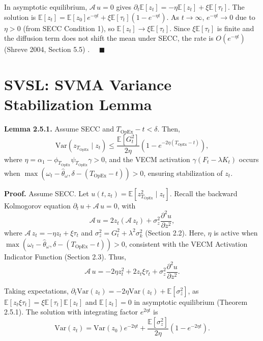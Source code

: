 \documentclass[12pt]{report}
\begin{document}
\vspace{0.2in}

In asymptotic equilibrium, \(\mathcal{A}\,u = 0\) gives \(\partial_t \mathbb{E}[z_t] = -\eta \mathbb{E}[z_t] + \xi \mathbb{E}[\tau_t]\). The solution is \(\mathbb{E}[z_t] = \mathbb{E}[z_0] e^{-\eta t} + \xi \mathbb{E}[\tau_t] (1 - e^{-\eta t})\). As \(t \to \infty\), \(e^{-\eta t} \to 0\) due to \(\eta > 0\) (from SECC Condition 1), so \(\mathbb{E}[z_t] \to \xi \mathbb{E}[\tau_t]\). Since \(\xi \mathbb{E}[\tau_t]\) is finite and the diffusion term does not shift the mean under SECC, the rate is \(O(e^{-\eta t})\) (Shreve 2004, Section 5.5) \cite{shreve2004}. \(\quad\blacksquare\)

\section{SVSL: SVMA Variance Stabilization Lemma}

\textbf{Lemma 2.5.1.} Assume SECC and \( T_{\text{OpEx}} - t < \delta \). Then,
\[
    \text{Var}(z_{T_{\text{OpEx}}} \mid z_t) \leq \frac{\mathbb{E}[G_t^2]}{2 \eta} \left(1 - e^{-2 \eta (T_{\text{OpEx}} - t)}\right),
\]
where \(\eta = \alpha_1 - \phi_{T_{\text{OpEx}}} \psi_{T_{\text{OpEx}}} \gamma > 0\), and the VECM activation \(\gamma (F_t - \lambda K_t)\) occurs when \(\max(\omega_t - \hat{\theta}_\omega, \delta - (T_{\text{OpEx}} - t)) > 0\), ensuring stabilization of \(z_t\).

\vspace{0.2in}

\textbf{Proof.} Assume SECC. Let \(u(t, z_t) = \mathbb{E}[z_{T_{\text{OpEx}}}^2 \mid z_t]\). Recall the backward Kolmogorov equation \(\partial_t\,u + \mathcal{A}\,u = 0\), with
\[
    \mathcal{A}\,u = 2 z_t (\mathcal{A}\,z_t) + \sigma_z^2 \frac{\partial^2 u}{\partial z^2},
\]
where \(\mathcal{A}\,z_t = -\eta z_t + \xi \tau_t\) and \(\sigma_z^2 = G_t^2 + \lambda^2 \sigma_k^2\) (Section 2.2). Here, \(\eta\) is active when \(\max(\omega_t - \hat{\theta}_\omega, \delta - (T_{\text{OpEx}} - t)) > 0\), consistent with the VECM Activation Indicator Function (Section 2.3). Thus,
\[
    \mathcal{A}\,u = -2 \eta z_t^2 + 2 z_t \xi \tau_t + \sigma_z^2 \frac{\partial^2 u}{\partial z^2}.
\]

Taking expectations, \(\partial_t \text{Var}(z_t) = -2 \eta \text{Var}(z_t) + \mathbb{E}[\sigma_z^2]\), as \(\mathbb{E}[z_t \xi \tau_t] = \xi \mathbb{E}[\tau_t] \mathbb{E}[z_t]\) and \(\mathbb{E}[z_t] = 0\) in asymptotic equilibrium (Theorem 2.5.1). The solution with integrating factor \(e^{2 \eta t}\) is
\[
    \text{Var}(z_t) = \text{Var}(z_0) e^{-2 \eta t} + \frac{\mathbb{E}[\sigma_z^2]}{2 \eta} (1 - e^{-2 \eta t}).
\]
\end{document}

